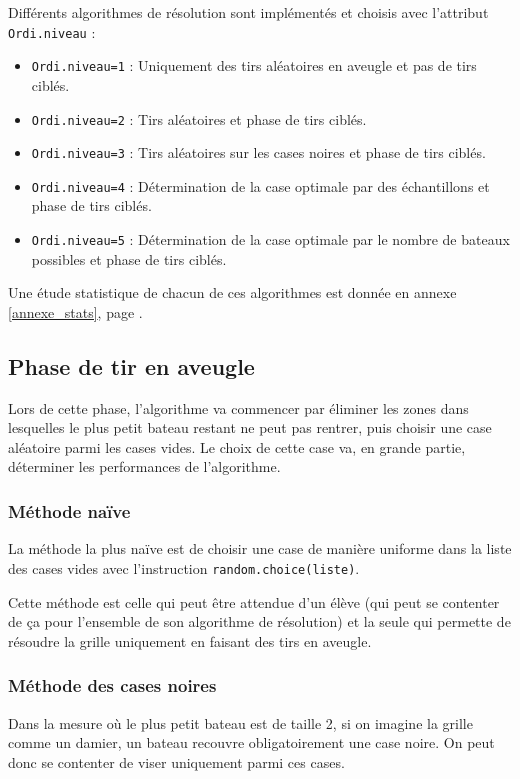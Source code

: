 Différents algorithmes de résolution sont implémentés et choisis avec l'attribut \texttt{Ordi.niveau} :
\begin{itemize}
\item \texttt{Ordi.niveau=1} : Uniquement des tirs aléatoires en aveugle et pas de tirs ciblés.
\item \texttt{Ordi.niveau=2} : Tirs aléatoires et phase de tirs ciblés.
\item \texttt{Ordi.niveau=3} : Tirs aléatoires sur les cases noires  et phase de tirs ciblés.
\item \texttt{Ordi.niveau=4} : Détermination de la case optimale par des échantillons et phase de tirs ciblés.
\item \texttt{Ordi.niveau=5} : Détermination de la case optimale par le nombre de bateaux possibles et phase de tirs ciblés.
\end{itemize}

Une étude statistique de chacun de ces algorithmes est donnée en annexe \ref{annexe_stats}, page \pageref{annexe_stats}.





\subsection{Phase de tir en aveugle}
Lors de cette phase, l'algorithme va commencer par éliminer les zones dans lesquelles le plus petit bateau restant ne peut pas rentrer, puis choisir une case aléatoire parmi les cases vides. Le choix de cette case va, en grande partie, déterminer les performances de l'algorithme.

\subsubsection{Méthode naïve}
La méthode la plus naïve est de choisir une case de manière uniforme dans la liste des cases vides avec l'instruction \texttt{random.choice(liste)}.

Cette méthode est celle qui peut être attendue d'un élève (qui peut se contenter de ça pour l'ensemble de son algorithme de résolution) et la seule qui permette de résoudre la grille uniquement en faisant des tirs en aveugle.

\subsubsection{Méthode des cases noires}
Dans la mesure où le plus petit bateau est de taille 2, si on imagine la grille comme un damier, un bateau recouvre obligatoirement une case noire. On peut donc se contenter de viser uniquement parmi ces cases.

